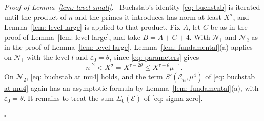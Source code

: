 \documentclass{article}
\numberwithin{equation}{section}
\newenvironment{proof}[1][Proof]{\par\medskip\noindent\textit{#1.}\ }{\hfill$\square$\par\medskip}
\newcommand{\Le}{\leqslant}
\begin{document}
\begin{proof}[Proof of Lemma~\ref{lem: level small}]
Buchstab's identity \eqref{eq: buchstab} is iterated until the product of $n$ and the primes it introduces has norm at least $X^{\sigma}$, and Lemma~\ref{lem: level large} is applied to that product. Fix $A$, let $C$ be as in the proof of Lemma~\ref{lem: level large}, and take $B = A + C + 4$. With $\mathcal{N}_1$ and $\mathcal{N}_2$ as in the proof of Lemma~\ref{lem: level large}, Lemma~\ref{lem: fundamental}(a) applies on $\mathcal{N}_1$ with the level $l$ and $\varepsilon_0 = \theta$, since \eqref{eq: parameters} gives
\begin{equation*}
|n|^2 < X^{\sigma} = X^{\tau - 2\theta} \Le X^{\tau - \theta} \mu^{-1}.
\end{equation*} On $\mathcal{N}_2$, \eqref{eq: buchstab at mu4} holds, and the term $S'(\mathcal{E}_n, \mu^4)$ of \eqref{eq: buchstab at mu4} again has an asymptotic formula by Lemma~\ref{lem: fundamental}(a), with $\varepsilon_0 = \theta$. It remains to treat the sum $\Sigma_0(\mathcal{E})$ of \eqref{eq: sigma zero}.


\end{proof}
\end{document}
